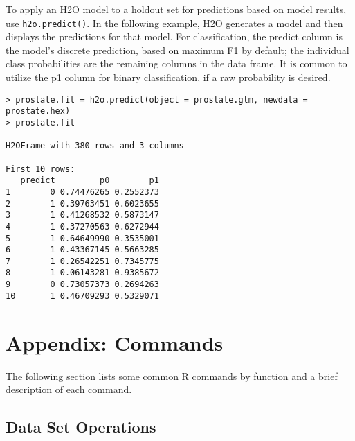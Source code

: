 {To apply an H2O model to a holdout set for predictions based on model results, use {\texttt{h2o.predict()}}.  
In the following example, H2O generates a model and then displays the predictions for that model.
For classification, the predict column is the model's discrete prediction, based on maximum F1 by default; the individual class probabilities are the remaining columns in the data frame. 
It is common to utilize the p1 column for binary classification, if a raw probability is desired.
\smallskip
\begin{lstlisting}[style=R]
> prostate.fit = h2o.predict(object = prostate.glm, newdata = prostate.hex)
> prostate.fit

H2OFrame with 380 rows and 3 columns

First 10 rows:
   predict         p0        p1
1        0 0.74476265 0.2552373
2        1 0.39763451 0.6023655
3        1 0.41268532 0.5873147
4        1 0.37270563 0.6272944
5        1 0.64649990 0.3535001
6        1 0.43367145 0.5663285
7        1 0.26542251 0.7345775
8        1 0.06143281 0.9385672
9        0 0.73057373 0.2694263
10       1 0.46709293 0.5329071
\end{lstlisting}

\newpage
\section{Appendix: Commands} \label{Appendix} 

The following section lists some common R commands by function and a brief description of each command. 

\subsection {Data Set Operations}
\bgroup\obeylines %

}
